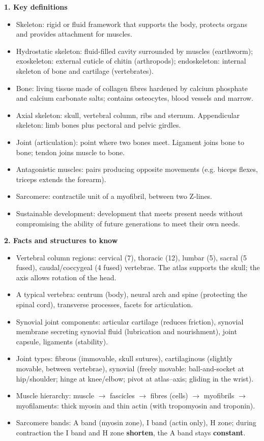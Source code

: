 \documentclass[11pt]{article}
\newcommand{\cle}[1]{{\popxbold\color{popdark}#1}}
\begin{document}
\begin{bilan}
\textbf{1. Key definitions}
\begin{itemize}
\item \cle{Skeleton}: rigid or fluid framework that supports the body, protects organs and provides attachment for muscles.
\item \cle{Hydrostatic skeleton}: fluid-filled cavity surrounded by muscles (earthworm); \cle{exoskeleton}: external cuticle of chitin (arthropods); \cle{endoskeleton}: internal skeleton of bone and cartilage (vertebrates).
\item \cle{Bone}: living tissue made of collagen fibres hardened by calcium phosphate and calcium carbonate salts; contains osteocytes, blood vessels and marrow.
\item \cle{Axial skeleton}: skull, vertebral column, ribs and sternum. \cle{Appendicular skeleton}: limb bones plus pectoral and pelvic girdles.
\item \cle{Joint (articulation)}: point where two bones meet. \cle{Ligament} joins bone to bone; \cle{tendon} joins muscle to bone.
\item \cle{Antagonistic muscles}: pairs producing opposite movements (e.g. biceps flexes, triceps extends the forearm).
\item \cle{Sarcomere}: contractile unit of a myofibril, between two Z-lines.
\item \cle{Sustainable development}: development that meets present needs without compromising the ability of future generations to meet their own needs.
\end{itemize}

\textbf{2. Facts and structures to know}
\begin{itemize}
\item Vertebral column regions: cervical (7), thoracic (12), lumbar (5), sacral (5 fused), caudal/coccygeal (4 fused) vertebrae. The \cle{atlas} supports the skull; the \cle{axis} allows rotation of the head.
\item A typical vertebra: centrum (body), neural arch and spine (protecting the spinal cord), transverse processes, facets for articulation.
\item Synovial joint components: articular \cle{cartilage} (reduces friction), \cle{synovial membrane} secreting \cle{synovial fluid} (lubrication and nourishment), joint capsule, ligaments (stability).
\item Joint types: fibrous (immovable, skull sutures), cartilaginous (slightly movable, between vertebrae), synovial (freely movable: ball-and-socket at hip/shoulder; hinge at knee/elbow; pivot at atlas--axis; gliding in the wrist).
\item Muscle hierarchy: muscle $\rightarrow$ fascicles $\rightarrow$ fibres (cells) $\rightarrow$ myofibrils $\rightarrow$ myofilaments: thick \cle{myosin} and thin \cle{actin} (with tropomyosin and troponin).
\item Sarcomere bands: A band (myosin zone), I band (actin only), H zone; during contraction the I band and H zone \textbf{shorten}, the A band stays \textbf{constant}.
\end{itemize}


\end{bilan}
\end{document}
